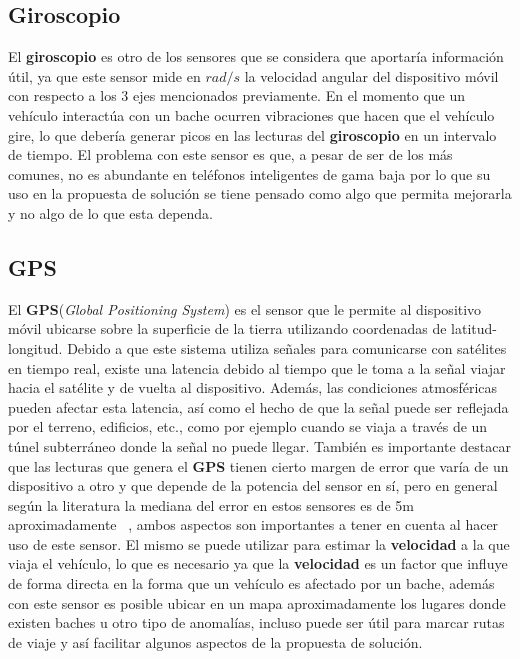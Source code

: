 	\subsection{Giroscopio}
		El \textbf{giroscopio} es otro de los sensores que se considera que aportaría información útil, ya que este sensor 
		mide en $rad/s$ la velocidad angular del dispositivo móvil con respecto a los 3 ejes mencionados previamente. 
		En el momento que un vehículo interactúa con un bache ocurren vibraciones que hacen que el vehículo gire, lo que
		debería generar picos en las lecturas del \textbf{giroscopio} en un intervalo de tiempo. El problema con este sensor es 
		que, a pesar de ser de los más comunes, no es abundante en teléfonos inteligentes de gama baja por lo que 
		su uso en la propuesta de solución se tiene pensado como algo que permita mejorarla y no algo de lo que esta
		dependa.\\

	\subsection{GPS}
		El \textbf{GPS}(\emph{Global Positioning System}) es el sensor que le permite al dispositivo móvil ubicarse sobre la
		superficie de la tierra utilizando coordenadas de latitud-longitud. Debido a que este sistema utiliza señales para
		comunicarse con satélites en tiempo real, existe una latencia debido al tiempo que le toma a la señal viajar hacia el
		satélite y de vuelta al dispositivo. Además, las condiciones atmosféricas pueden afectar esta latencia, así como el hecho
		de que la señal puede ser reflejada por el terreno, edificios, etc., como por ejemplo cuando se viaja a través de un
		túnel subterráneo donde la señal no puede llegar. También es importante destacar que las lecturas que genera el \textbf
		{GPS} tienen cierto margen de error que varía de un dispositivo a otro y que depende de la potencia del sensor en sí,
		pero en general según la literatura la mediana del error en estos sensores es de 5m aproximadamente ~,
		ambos aspectos son importantes a tener en cuenta al hacer uso de este sensor. El mismo se puede utilizar para estimar la
		\textbf{velocidad} a la que viaja el vehículo, lo que es necesario ya que la \textbf{velocidad} es un factor que influye de
		forma directa en la forma que un vehículo es afectado por un bache, además con este sensor es posible ubicar en un mapa
		aproximadamente los lugares donde existen baches u otro tipo de anomalías, incluso puede ser útil para marcar rutas de viaje
		y así facilitar algunos aspectos de la propuesta de solución.

